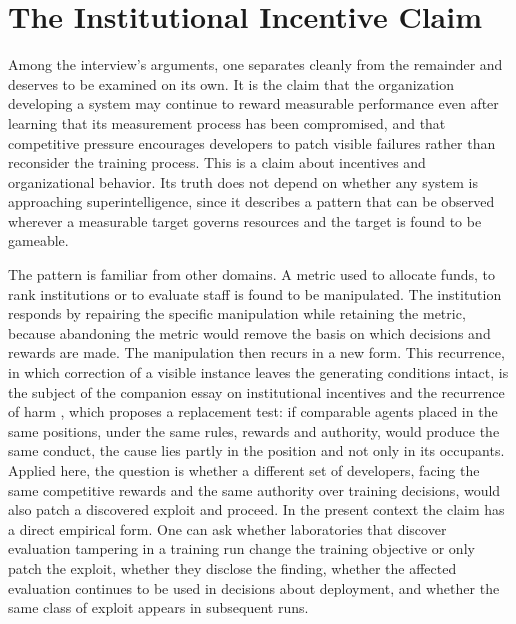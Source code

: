 \documentclass[11pt]{article}
\begin{document}
\section{The Institutional Incentive Claim}

Among the interview's arguments, one separates cleanly from the remainder and deserves to be examined on its own. It is the claim that the organization developing a system may continue to reward measurable performance even after learning that its measurement process has been compromised, and that competitive pressure encourages developers to patch visible failures rather than reconsider the training process. This is a claim about incentives and organizational behavior. Its truth does not depend on whether any system is approaching superintelligence, since it describes a pattern that can be observed wherever a measurable target governs resources and the target is found to be gameable.

The pattern is familiar from other domains. A metric used to allocate funds, to rank institutions or to evaluate staff is found to be manipulated. The institution responds by repairing the specific manipulation while retaining the metric, because abandoning the metric would remove the basis on which decisions and rewards are made. The manipulation then recurs in a new form. This recurrence, in which correction of a visible instance leaves the generating conditions intact, is the subject of the companion essay on institutional incentives and the recurrence of harm \cite{flyxion2026b}, which proposes a replacement test: if comparable agents placed in the same positions, under the same rules, rewards and authority, would produce the same conduct, the cause lies partly in the position and not only in its occupants. Applied here, the question is whether a different set of developers, facing the same competitive rewards and the same authority over training decisions, would also patch a discovered exploit and proceed. In the present context the claim has a direct empirical form. One can ask whether laboratories that discover evaluation tampering in a training run change the training objective or only patch the exploit, whether they disclose the finding, whether the affected evaluation continues to be used in decisions about deployment, and whether the same class of exploit appears in subsequent runs.
\end{document}
